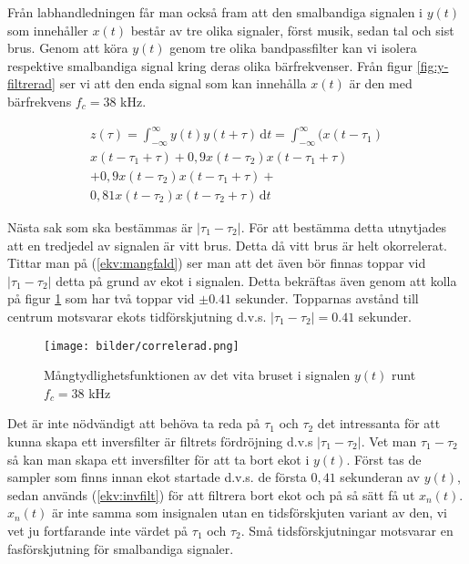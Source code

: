 \documentclass[10pt,twocolumn]{article}
\begin{document}
Från labhandledningen får man också fram att den smalbandiga signalen i $y(t)$ som innehåller $x(t)$ består av tre olika signaler, först musik, sedan tal och sist brus. Genom att köra $y(t)$ genom tre olika bandpassfilter kan vi isolera respektive smalbandiga signal kring deras olika bärfrekvenser. Från figur \ref{fig:y-filtrerad} ser vi att den enda signal som kan innehålla $x(t)$ är den med bärfrekvens $f_c = 38$ kHz.

\begin{equation}
\begin{split}
z(\tau) = \int_{-\infty}^\infty y(t)y(t+\tau)\,\mathrm{d}t=
\int_{-\infty}^\infty (x(t-\tau_1)\\x(t-\tau_1+\tau)+0,9x(t-\tau_2)x(t-\tau_1+\tau)\\
+ 0,9x(t-\tau_2)x(t-\tau_1+\tau) + \\0,81x(t-\tau_2)x(t-\tau_2+\tau)\,\mathrm{d}t
\end{split} 
\label{ekv:mangfald}
\end{equation} 

Nästa sak som ska bestämmas är $|\tau_1 - \tau_2|$. För att bestämma detta utnytjades att en tredjedel av signalen är vitt brus. Detta då vitt brus är helt okorrelerat. Tittar man på (\ref{ekv:mangfald}) ser man att det även bör finnas toppar vid  $|\tau_1-\tau_2|$ detta på grund av ekot i signalen. Detta bekräftas även genom att kolla på figur \ref{fig:corr} som har två toppar vid $\pm 0.41$ sekunder. Topparnas avstånd till centrum motsvarar ekots tidförskjutning d.v.s. $|\tau_1-\tau_2| = 0.41$ sekunder.

\begin{figure}
\centering
\texttt{[image: bilder/correlerad.png]}
\caption{Mångtydlighetsfunktionen av det vita bruset i signalen $y(t)$ runt  $f_c = 38$ kHz}
\label{fig:corr}
\end{figure}

Det är inte nödvändigt att behöva ta reda på $\tau_1$ och $\tau_2$ det intressanta för att kunna skapa ett inversfilter är filtrets fördröjning d.v.s $|\tau_1-\tau_2|$. Vet man $\tau_1-\tau_2$ så kan man skapa ett inversfilter för att ta bort ekot i $y(t)$. Först tas de sampler som finns innan ekot startade d.v.s. de första $0,41$ sekunderan av $y(t)$, sedan används (\ref{ekv:invfilt}) för att filtrera bort ekot och på så sätt få ut $x_n(t)$. $x_n(t)$ är inte samma som insignalen utan en tidsförskjuten variant av den, vi vet ju fortfarande inte värdet på $\tau_1$ och $\tau_2$. Små tidsförskjutningar motsvarar en fasförskjutning för smalbandiga signaler.
\end{document}
